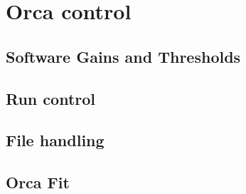 
\chapter{Orca control}
\label{ch:Content1}


    \section{Software Gains and Thresholds}
    \label{ch:Content2:sec:Section1}

    \section{Run control}
    \label{ch:Content2:sec:Section1}
    
    \section{File handling}
    \label{ch:Content2:sec:Section1}

    \section{Orca Fit}
    \label{ch:Content2:sec:Section2}
